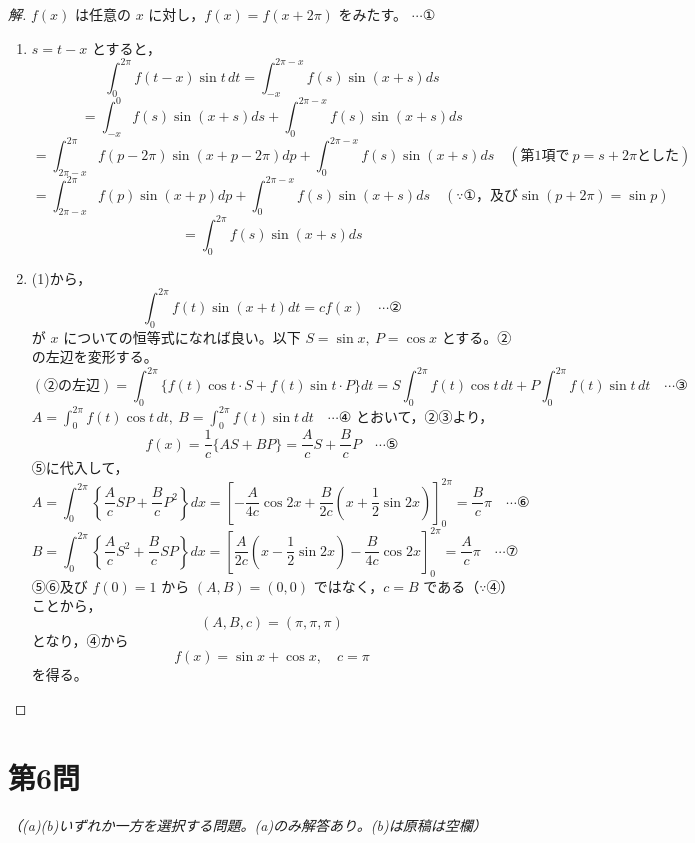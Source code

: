 \documentclass[../main.tex]{subfiles}
\begin{document}
\begin{proof}[解]
  $f(x)$ は任意の $x$ に対し，$f(x)=f(x+2\pi)$ をみたす。 $\cdots$①

  \begin{enumerate}
    \item[(1)] $s=t-x$ とすると，
      \[
        \int_0^{2\pi}f(t-x)\sin t\,dt=\int_{-x}^{2\pi-x}f(s)\sin(x+s)ds
      \]
      \[
        =\int_{-x}^{0}f(s)\sin(x+s)ds+\int_0^{2\pi-x}f(s)\sin(x+s)ds
      \]
      \[
        =\int_{2\pi-x}^{2\pi}f(p-2\pi)\sin(x+p-2\pi)dp+\int_0^{2\pi-x}f(s)\sin(x+s)ds \quad (\text{第1項で}\ p=s+2\pi\text{とした})
      \]
      \[
        =\int_{2\pi-x}^{2\pi}f(p)\sin(x+p)dp+\int_0^{2\pi-x}f(s)\sin(x+s)ds \quad (\because①，及び\sin(p+2\pi)=\sin p)
      \]
      \[
        =\int_0^{2\pi}f(s)\sin(x+s)ds
      \]

    \item[(2)] (1)から，
      \[
        \int_0^{2\pi}f(t)\sin(x+t)dt=cf(x) \quad \cdots \text{②}
      \]
      が $x$ についての恒等式になれば良い。以下 $S=\sin x,\ P=\cos x$ とする。②の左辺を変形する。
      \[
        (\text{②の左辺})=\int_0^{2\pi}\{f(t)\cos t\cdot S+f(t)\sin t\cdot P\}dt = S\int_0^{2\pi}f(t)\cos t\,dt+P\int_0^{2\pi}f(t)\sin t\,dt \quad \cdots \text{③}
      \]
      $A=\displaystyle\int_0^{2\pi}f(t)\cos t\,dt,\ B=\int_0^{2\pi}f(t)\sin t\,dt \quad \cdots \text{④}$ とおいて，②③より，
      \[
        f(x)=\frac1c\{AS+BP\}=\frac{A}{c}S+\frac{B}{c}P \quad \cdots \text{⑤}
      \]
      ⑤に代入して，
      \[
        A=\int_0^{2\pi}\left\{\frac{A}{c}SP+\frac{B}{c}P^2\right\}dx=\left[-\frac{A}{4c}\cos2x+\frac{B}{2c}\left(x+\frac12\sin2x\right)\right]_0^{2\pi}=\frac{B}{c}\pi \quad \cdots \text{⑥}
      \]
      \[
        B=\int_0^{2\pi}\left\{\frac{A}{c}S^2+\frac{B}{c}SP\right\}dx=\left[\frac{A}{2c}\left(x-\frac12\sin2x\right)-\frac{B}{4c}\cos2x\right]_0^{2\pi}=\frac{A}{c}\pi \quad \cdots \text{⑦}
      \]
      ⑤⑥及び $f(0)=1$ から $(A,B)=(0,0)$ ではなく，$c=B$ である（$\because$④）ことから，
      \[
        (A,B,c)=(\pi,\pi,\pi)
      \]
      となり，④から
      \[
        f(x)=\sin x+\cos x, \quad c=\pi
      \]
      を得る。
  \end{enumerate}
\end{proof}

\newpage

\section*{第6問}

\begin{flushright}
  \footnotesize\textit{（(a)(b)いずれか一方を選択する問題。(a)のみ解答あり。(b)は原稿は空欄）}
\end{flushright}
\end{document}
